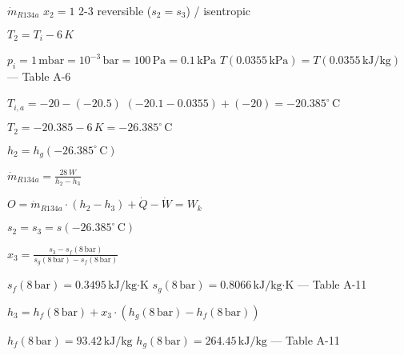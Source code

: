 \( \dot{m}_{R134a} \)  
\( x_2 = 1 \)  
2-3 reversible (\( s_2 = s_3 \)) / isentropic  

\( T_2 = T_i - 6 \, K \)  

\( p_i = 1 \, \text{mbar} = 10^{-3} \, \text{bar} = 100 \, \text{Pa} = 0.1 \, \text{kPa} \)  
\( T(0.0355 \, \text{kPa}) = T(0.0355 \, \text{kJ/kg}) \) — Table A-6  

\( T_{i,a} = -20 - (-20.5) \)  
\( (-20.1 - 0.0355) + (-20) = -20.385^\circ \, \text{C} \)  

\( T_2 = -20.385 - 6 \, K = -26.385^\circ \, \text{C} \)  

\( h_2 = h_g(-26.385^\circ \, \text{C}) \)  

\( \dot{m}_{R134a} = \frac{28 \, W}{h_2 - h_3} \)  

\( O = \dot{m}_{R134a} \cdot (h_2 - h_3) + \dot{Q} - \dot{W} = W_k \)  

\( s_2 = s_3 = s(-26.385^\circ \, \text{C}) \)  

\( x_3 = \frac{s_3 - s_f(8 \, \text{bar})}{s_g(8 \, \text{bar}) - s_f(8 \, \text{bar})} \)  

\( s_f(8 \, \text{bar}) = 0.3495 \, \text{kJ/kg·K} \)  
\( s_g(8 \, \text{bar}) = 0.8066 \, \text{kJ/kg·K} \) — Table A-11  

\( h_3 = h_f(8 \, \text{bar}) + x_3 \cdot (h_g(8 \, \text{bar}) - h_f(8 \, \text{bar})) \)  

\( h_f(8 \, \text{bar}) = 93.42 \, \text{kJ/kg} \)  
\( h_g(8 \, \text{bar}) = 264.45 \, \text{kJ/kg} \) — Table A-11
